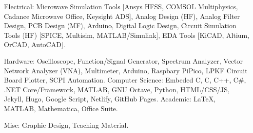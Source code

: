 

\begin{cvskills}

  \cvskill
    {Electrical:} %
    {Microwave Simulation Tools [Ansys HFSS, COMSOL Multiphysics, Cadance Microwave Office, Keysight ADS], Analog Design (HF), Analog Filter Design, PCB Design (MF), Arduino, Digital Logic Design, Circuit Simulation Tools (HF) [SPICE, Multisim, MATLAB/Simulink], EDA Tools [KiCAD, Altium, OrCAD, AutoCAD].} %

\cvskill
    {Hardware:}
    {Oscilloscope, Function/Signal Generator, Spectrum Analyzer, Vector Network Analyzer (VNA), Multimeter, Arduino, Raspbary PiPico, LPKF Circuit Board Plotter, SCPI Automation. }
  \cvskill
    {Computer Science:} %
    {Embeded C, C, C++, C\#, .NET Core/Framework, MATLAB, GNU Octave, Python, HTML/CSS/JS, Jekyll, Hugo, Google Script, Netlify, GitHub Pages.} %
  \cvskill
    {Academic:} %
    {\LaTeX, MATLAB, Mathematica, Office Suite.} %


  \cvskill
    {Misc:} %
    {Graphic Design, Teaching Material.} %
\end{cvskills}
